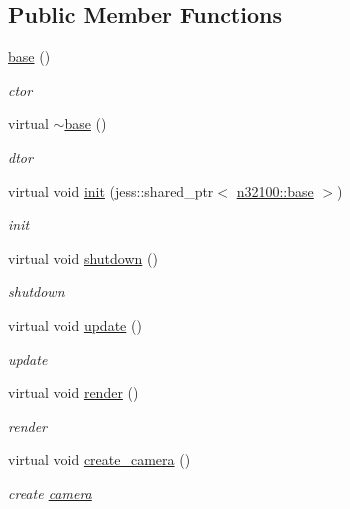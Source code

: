 \subsection*{Public Member Functions}
\begin{DoxyCompactItemize}
\item 
\hyperlink{classnebula_1_1content_1_1view_1_1admin_1_1base_a42c5f438bf2b5a658aaa1849e8a1be1c}{base} ()
\begin{DoxyCompactList}\small\item\em ctor \item\end{DoxyCompactList}\item 
virtual \hyperlink{classnebula_1_1content_1_1view_1_1admin_1_1base_adf0b4240e57271d4f381cde906367633}{$\sim$base} ()
\begin{DoxyCompactList}\small\item\em dtor \item\end{DoxyCompactList}\item 
virtual void \hyperlink{classnebula_1_1content_1_1view_1_1admin_1_1base_a8226e4b40dd4752b5b88f868ac6185ca}{init} (jess::shared\_\-ptr$<$ \hyperlink{classnebula_1_1content_1_1scene_1_1admin_1_1base}{n32100::base} $>$)
\begin{DoxyCompactList}\small\item\em init \item\end{DoxyCompactList}\item 
virtual void \hyperlink{classnebula_1_1content_1_1view_1_1admin_1_1base_a4002143535859c70b6cf7fc9c8dd8394}{shutdown} ()
\begin{DoxyCompactList}\small\item\em shutdown \item\end{DoxyCompactList}\item 
virtual void \hyperlink{classnebula_1_1content_1_1view_1_1admin_1_1base_a6800944fd9dd37f6b15f0a9992bb3477}{update} ()
\begin{DoxyCompactList}\small\item\em update \item\end{DoxyCompactList}\item 
virtual void \hyperlink{classnebula_1_1content_1_1view_1_1admin_1_1base_a9bd1285f26e75372fd8c3cf1da848f29}{render} ()
\begin{DoxyCompactList}\small\item\em render \item\end{DoxyCompactList}\item 
virtual void \hyperlink{classnebula_1_1content_1_1view_1_1admin_1_1base_ad1325929fa62c561c9546bf7b92c330d}{create\_\-camera} ()
\begin{DoxyCompactList}\small\item\em create \hyperlink{classnebula_1_1content_1_1camera}{camera} \item\end{DoxyCompactList}\end{DoxyCompactItemize}
